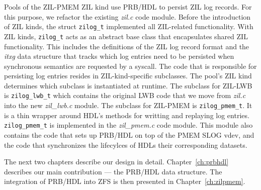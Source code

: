 \documentclass[12pt,a4paper,twoside]{book}
\begin{document}
Pools of the ZIL-PMEM ZIL kind use PRB/HDL to persist ZIL log records.
For this purpose, we refactor the existing \textit{zil.c} code module.
Before the introduction of ZIL kinds, the struct \lstinline{zilog_t} implemented all ZIL-related functionality.
With ZIL kinds, \lstinline{zilog_t} acts as an abstract base class that encapsulates shared ZIL functionality.
This includes the definitions of the ZIL log record format and the \textit{itxg} data structure that tracks which log entries need to be persisted when synchronous semantics are requested by a syscall.
The code that is responsible for persisting log entries resides in ZIL-kind-specific subclasses.
The pool's ZIL kind determines which subclass is instantiated at runtime.
The subclass for ZIL-LWB is \lstinline{zilog_lwb_t} which contains the original LWB code that we move from \textit{zil.c} into the new \textit{zil\_lwb.c} module.
The subclass for ZIL-PMEM is \lstinline{zilog_pmem_t}.
It is a thin wrapper around HDL's methods for writting and replaying log entries.
\lstinline{zilog_pmem_t} is implemented in the \textit{zil\_pmem.c} code module.
This module also contains the code that sets up PRB/HDL on top of the PMEM SLOG vdev, and the code that synchronizes the lifecylces of HDLs their corresponding datasets.

The next two chapters describe our design in detail.
Chapter~\ref{ch:prbhdl} describes our main contribution --- the PRB/HDL data structure.
The integration of PRB/HDL into ZFS is then presented in Chapter~\ref{ch:zilpmem}.
\end{document}

